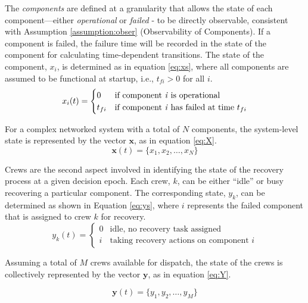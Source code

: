 \documentclass[conference]{IEEEtran}
\begin{document}
The \emph{components} are defined at a granularity that allows the state of each component—either \emph{operational} or \emph{failed} - to be directly observable, consistent with Assumption \ref{assumption:obser} (Observability of Components). If a component is failed, the failure time will be recorded in the state of the component for calculating time-dependent transitions. The state of the component, $x_i$, is determined as in equation \ref{eq:xs}, where all components are assumed to be functional at startup, i.e., $t_{fi}>0$ for all $i$.
\begin{equation} x_i (t)= \begin{cases}
    0 & \text{if component \textit{i} is operational}  \\
    t_{fi} & \text{if component \textit{i} has failed at time $t_{fi}$}
    \label{eq:xs}
\end{cases}\end{equation}

For a complex networked system with a total of $N$ components, the system-level state is represented by the vector $\mathbf{x}$, as in equation \ref{eq:X}.
\begin{equation}
\mathbf{x} (t) = \{ x_1, x_2, \ldots , x_N \}
\label{eq:X}
\end{equation}

Crews are the second aspect involved in identifying the state of the recovery process at a given decision epoch. Each crew, $k$, can be either ``idle'' or busy recovering a particular component. The corresponding state, $y_k$, can be determined as shown in Equation \ref{eq:ys}, where $i$ represents the failed component that is assigned to crew $k$ for recovery. 
\begin{equation} y_k (t)= \begin{cases}
    0 & \text{idle, no recovery task assigned} \\
    i & \text{taking recovery actions on component $i$}
    \label{eq:ys}
\end{cases}\end{equation}

Assuming a total of $M$ crews available for dispatch, the state of the crews is collectively represented by the vector $\mathbf{y}$, as in equation \ref{eq:Y}. 

\begin{equation}
\mathbf{y}(t) = \{ y_1, y_2, \ldots , y_M \}
\label{eq:Y}
\end{equation}
\end{document}
